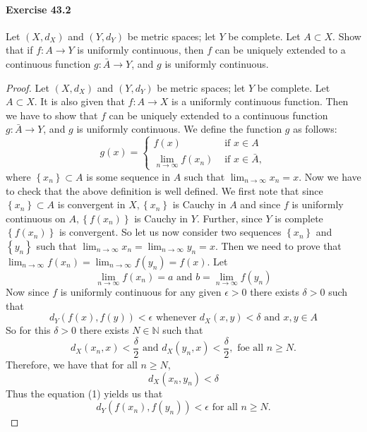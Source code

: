 \documentclass{article}
\begin{document}
\paragraph{Exercise 43.2} Let $(X, d_X)$ and $(Y, d_Y)$ be metric spaces; let $Y$ be complete. Let $A \subset X$. Show that if $f \colon A \rightarrow Y$ is uniformly continuous, then $f$ can be uniquely extended to a continuous function $g \colon \bar{A} \rightarrow Y$, and $g$ is uniformly continuous.
\begin{proof}
    Let $\left(X, d_X\right)$ and $\left(Y, d_Y\right)$ be metric spaces; let $Y$ be complete. Let $A \subset X$. It is also given that $f: A \longrightarrow X$ is a uniformly continuous function. Then we have to show that $f$ can be uniquely extended to a continuous function $g: \bar{A} \longrightarrow Y$, and $g$ is uniformly continuous.
We define the function $g$ as follows:
$$
g(x)= \begin{cases}f(x) & \text { if } x \in A \\ \lim _{n \rightarrow \infty} f\left(x_n\right) & \text { if } x \in \bar{A},\end{cases}
$$
where $\left\{x_n\right\} \subset A$ is some sequence in $A$ such that $\lim _{n \rightarrow \infty} x_n=x$. Now we have to check that the above definition is well defined. We first note that since $\left\{x_n\right\} \subset A$ is convergent in $X,\left\{x_n\right\}$ is Cauchy in $A$ and since $f$ is uniformly continuous on $A,\left\{f\left(x_n\right)\right\}$ is Cauchy in $Y$. Further, since $Y$ is complete $\left\{f\left(x_n\right)\right\}$ is convergent. So let us now consider two sequences $\left\{x_n\right\}$ and $\left\{y_n\right\}$ such that $\lim _{n \rightarrow \infty} x_n=\lim _{n \rightarrow \infty} y_n=x$. Then we need to prove that $\lim _{n \rightarrow \infty} f\left(x_n\right)=\lim _{n \rightarrow \infty} f\left(y_n\right)=f(x)$. Let
$$
\lim _{n \rightarrow \infty} f\left(x_n\right)=a \text { and } b=\lim _{n \rightarrow \infty} f\left(y_n\right)
$$
Now since $f$ is uniformly continuous for any given $\epsilon>0$ there exists $\delta>0$ such that
$$
d_Y(f(x), f(y))<\epsilon \text { whenever } d_X(x, y)<\delta \text { and } x, y \in A
$$
So for this $\delta>0$ there exists $N \in \mathbb{N}$ such that
$$
d_X\left(x_n, x\right)<\frac{\delta}{2} \text { and } d_X\left(y_n, x\right)<\frac{\delta}{2}, \text { foe all } n \geq N .
$$
Therefore, we have that for all $n \geq N$,
$$
d_X\left(x_n, y_n\right)<\delta
$$
Thus the equation (1) yields us that
$$
d_Y\left(f\left(x_n\right), f\left(y_n\right)\right)<\epsilon \text { for all } n \geq N .
$$
\end{proof}
\end{document}
